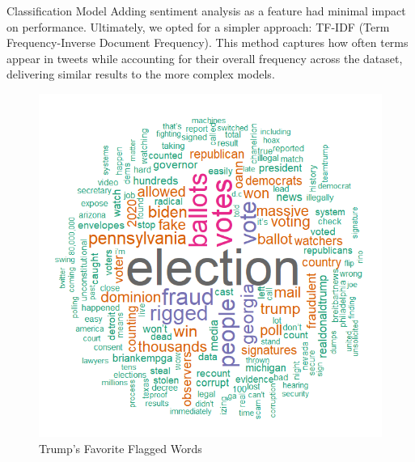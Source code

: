 \documentclass[final]{beamer}
\newlength{\colwidth}
\begin{document}
\begin{frame}[t]
\begin{columns}[t]
\begin{column}{\colwidth}
\begin{block}{Classification Model}
        Adding sentiment analysis as a feature had minimal impact on performance. Ultimately, we opted for a simpler approach: TF-IDF (Term Frequency-Inverse Document Frequency). This method captures how often terms appear in tweets while accounting for their overall frequency across the dataset, delivering similar results to the more complex models.
        \vspace{-30pt}
        \begin{figure}
            \centering
            \includegraphics[scale=1.22]{figures/wordcloud.png}
            \caption{Trump's Favorite Flagged Words} 
        \end{figure}

 
    \begin{large}

    \end{large}
\vspace*{-5mm}
\begin{enumerate}

    \begin{large}
    
 
    
    \end{large}   
\end{enumerate}



  \end{block}
    


\end{column}
\end{columns}
\end{frame}
\end{document}
